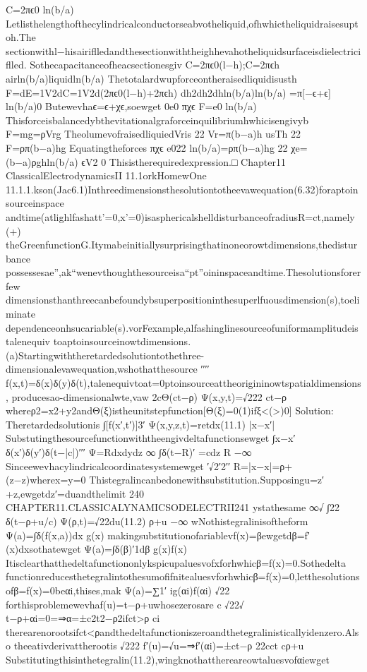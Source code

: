 {{{{{{{{{{{{{{{C=2πϵ0
ln(b/a)
Letlisthelengthofthecylindricalconductorseabvotheliquid,ofhwhictheliquidraisesuptoh.The
sectionwithl−hisairiflledandthesectionwiththeighhevahotheliquidsurfaceisdielectriciflled.
Sothecapacitanceofheacsectionesgiv
C=2πϵ0(l−h);C=2πϵh
airln(b/a)liquidln(b/a)
Thetotalardwupforceontheraisedliquidisusth
F=dE=1V2dC=1V2d(2πϵ0(l−h)+2πϵh)
dh2dh2dhln(b/a)ln(b/a)
=π[−ϵ+ϵ]
ln(b/a)0
Butewevhaϵ=ϵ+χϵ,soewget
0e0
πχϵ
F=e0
ln(b/a)
Thisforceisbalancedybthevitationalgraforceinquilibriumhwhicisengivyb
F=mg=ρVrg
TheolumevofraisedliquiedVris
22
Vr=π(b−a)h
usTh
22
F=ρπ(b−a)hg
Equatingtheforces
πχϵ
e022
ln(b/a)=ρπ(b−a)hg
22
χe=(b−a)ρghln(b/a)
ϵV2
0
Thisistherequiredexpression.□
Chapter11
ClassicalElectrodynamicsII
11.1orkHomewOne
11.1.1.kson(Jac6.1)Inthreedimensionsthesolutiontotheevawequation(6.32)foraptoinsourceinspace
andtime(atlighlfashatt’=0,x’=0)isasphericalshelldisturbanceofradiusR=ct,namely
(+)
theGreenfunctionG.Itymabeinitiallysurprisingthatinoneorowtdimensions,thedisturbance
possessesae”,ak“wenevthoughthesourceisa“pt”oininspaceandtime.Thesolutionsforerfew
dimensionsthanthreecanbefoundybsuperpositioninthesuperlfuousdimension(s),toeliminate
dependenceonhsucariable(s).vorFexample,alfashinglinesourceofuniformamplitudeistalenequiv
toaptoinsourceinowtdimensions.
(a)Startingwiththeretardedsolutiontothethree-dimensionalevawequation,wshothatthesource
′′′′
f(x,t)=δ(x)δ(y)δ(t),talenequivtoat=0ptoinsourceattheorigininowtspatialdimensions,
producesao-dimensionalwte,vaw
2cΘ(ct−ρ)
Ψ(x,y,t)=√222
ct−ρ
whereρ2=x2+y2andΘ(ξ)istheunitstepfunction[Θ(ξ)=0(1)ifξ<(>)0]
Solution:
Theretardedsolutionis
∫[f(x′,t′)]3′
Ψ(x,y,z,t)=retdx(11.1)
|x−x′|
Substutingthesourcefunctionwiththeengivdeltafunctionsewget
∫x−x′
δ(x′)δ(y′)δ(t−|c|)′′′
Ψ=Rdxdydz
∞
∫δ(t−R)′
=cdz
R
−∞
Sinceewevhacylindricalcoordinatesystemewget
′√2′2′′
R=|x−x|=ρ+(z−z)wherex=y=0
Thistegralincanbedonewithsubstitution.Supposingu=z′+z,ewgetdz′=duandthelimit
240
CHAPTER11.CLASSICALYNAMICSODELECTRII241
ystathesame
∞√
∫22
δ(t−ρ+u/c)
Ψ(ρ,t)=√22du(11.2)
ρ+u
−∞
wNothistegralinisoftheform
Ψ(a)=∫δ(f(x,a))dx
g(x)
makingsubstitutionofariablevf(x)=βewgetdβ=f′(x)dxsothatewget
Ψ(a)=∫δ(β)′1dβ
g(x)f(x)
Itisclearthatthedeltafunctiononlykspicupaluesvofxforhwhicβ=f(x)=0.Sothedelta
functionreducesthetegralintothesumofifnitealuesvforhwhicβ=f(x)=0,letthesolutions
ofβ=f(x)=0beαi,thises,mak
Ψ(a)=∑1′
ig(αi)f(αi)
√22
forthisproblemewevhaf(u)=t−ρ+uwhosezerosare
c
√22√
t−ρ+αi=0=⇒α=±c2t2−ρ2ifct>ρ
ci
therearenorootsifct<ρandthedeltafunctioniszeroandthetegralinisticallyidenzero.Also
theeativderivattherootis
√222
f′(u)=√u=⇒f′(αi)=±ct−ρ
22cct
cρ+u
Substitutingthisinthetegralin(11.2),wingknothatthereareowtaluesvofαiewget
}}}}}}}}}}}}}}}
